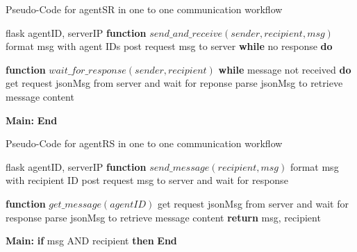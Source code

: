 \begin{algorithm}
    \caption{Pseudo-Code for agentSR in one to one communication workflow}
    \label{alg: SRPseudoCode}
    \begin{algorithmic}[1]
     flask
     agentID, serverIP
        \State \textbf{function} {$send\_and\_receive(sender, recipient, msg)$}
        \State \qquad format msg with agent IDs 
        \State \qquad post request msg to server
        \State \textbf{\qquad while} no response \textbf{do}    
        \State \qquad {}

        \State \textbf{function} {$wait\_for\_response(sender, recipient)$}
        \State \textbf{\qquad while} message not received \textbf{do}    
        \State \qquad \qquad get request jsonMsg from server and wait for reponse
        \State \qquad \qquad parse jsonMsg to retrieve message content
    

    \State \textbf{Main:}
    \State {}
    \State \textbf{End} 
    \end{algorithmic}
    \end{algorithm}


    \begin{algorithm}
        \caption{Pseudo-Code for agentRS in one to one communication workflow}
        \label{alg: RSPseudoCode}
        \begin{algorithmic}[1]
         flask
         agentID, serverIP
            \State \textbf{function} {$send\_message(recipient, msg)$}
            \State \qquad format msg with recipient ID 
            \State \qquad post request msg to server and wait for response 
    
            \State \textbf{function} {$get\_message(agentID)$}  
            \State \qquad get request jsonMsg from server and wait for response
            \State \qquad parse jsonMsg to retrieve message content
            \State \qquad \textbf{return} msg, recipient         
    
        \State \textbf{Main:}
        \State {}
        \State \textbf{\qquad if} msg AND recipient \textbf{then}   
        \State \qquad {}
        \State \textbf{End} 
        \end{algorithmic}
        \end{algorithm}

